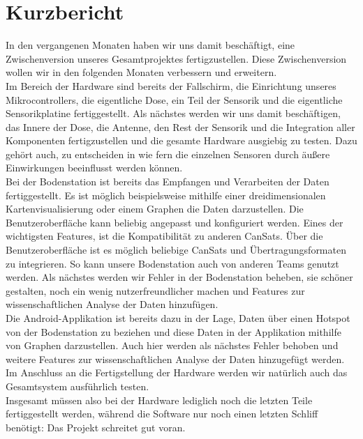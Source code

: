\section{Kurzbericht}
In den vergangenen Monaten haben wir uns damit beschäftigt, eine Zwischenversion unseres Gesamtprojektes fertigzustellen. Diese Zwischenversion wollen wir in den folgenden Monaten verbessern und erweitern.\\ 
Im Bereich der Hardware sind bereits der Fallschirm, die Einrichtung unseres Mikrocontrollers, die eigentliche Dose, ein Teil der Sensorik und die eigentliche Sensorikplatine fertiggestellt. Als nächstes werden wir uns damit beschäftigen, das Innere der Dose, die Antenne, den Rest der Sensorik und die Integration aller Komponenten fertigzustellen und die gesamte Hardware ausgiebig zu testen. Dazu gehört auch, zu entscheiden in wie fern die einzelnen Sensoren durch äußere Einwirkungen beeinflusst werden können.\\
Bei der Bodenstation ist bereits das Empfangen und Verarbeiten der Daten fertiggestellt. Es ist möglich beispielsweise mithilfe einer dreidimensionalen Kartenvisualisierung oder einem Graphen die Daten darzustellen. Die Benutzeroberfläche kann beliebig angepasst und konfiguriert werden. Eines der wichtigsten Features, ist die Kompatibilität zu anderen CanSats. Über die Benutzeroberfläche ist es möglich beliebige CanSats und Übertragungsformaten zu integrieren. So kann unsere Bodenstation auch von anderen Teams genutzt werden. Als nächstes werden wir Fehler in der Bodenstation beheben, sie schöner gestalten, noch ein wenig nutzerfreundlicher machen und Features zur wissenschaftlichen Analyse der Daten hinzufügen. \\
Die Android-Applikation ist bereits dazu in der Lage, Daten über einen Hotspot von der Bodenstation zu beziehen und diese Daten in der Applikation mithilfe von Graphen darzustellen. Auch hier werden als nächstes Fehler behoben und weitere Features zur wissenschaftlichen Analyse der Daten hinzugefügt werden. \\
Im Anschluss an die Fertigstellung der Hardware werden wir natürlich auch das Gesamtsystem ausführlich testen. \\
Insgesamt müssen also bei der Hardware lediglich noch die letzten Teile fertiggestellt werden, während die Software nur noch einen letzten Schliff benötigt: Das Projekt schreitet gut voran.